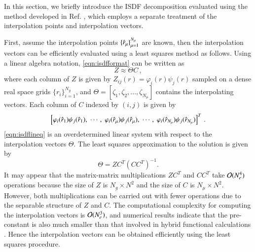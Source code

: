 In this section, we briefly introduce the ISDF decomposition 
\cite{JCP_302_329_2015_ISDF} evaluated using the method developed in Ref. 
\cite{JCTC_2017_ISDF}, which employs a separate treatment of the interpolation
points and interpolation vectors.

First, assume the interpolation points $\{\hat{r}_\mu\}_{\mu=1}^{N_{\mu}}$ are
known, then the interpolation vectors can be efficiently evaluated using a least
squares method as follows. Using a linear algebra notation, 
\cref{eqn:isdfformat} can be written as
\begin{equation}\label{eqn:isdflineq}
  Z \approx \Theta C\,,
\end{equation}
where each column of $Z$ is given by $Z_{ij}(r)=\varphi_{i}(r)\psi_{j}(r)$
sampled on a dense real space grids $\{r_{i}\}_{i=1}^{N_g}$, and $\Theta = 
[\zeta_1, \zeta_2, ..., \zeta_{N_{\mu}}]$ contains the interpolating vectors.
Each column of $C$ indexed by $(i,j)$ is given by
\begin{equation}
	\left[ \varphi_{i}(\hat{r}_1)\psi_{j}(\hat{r}_1),\; \cdots,\;
  \varphi_{i}(\hat{r}_\mu)\psi_{j}(\hat{r}_\mu),\; \cdots,\;
  \varphi_{i}(\hat{r}_{N_{\mu}})\psi_{j}(\hat{r}_{N_{\mu}})\right]^T\,.
\end{equation}
\cref{eqn:isdflineq} is an overdetermined linear system with respect to the
interpolation vectors $\Theta$. The least squares approximation to the solution
is given by
\begin{equation}\label{eq:Theta}
  \Theta = ZC^T (CC^T)^{-1}.
\end{equation}
It may appear that the matrix\hyp{}matrix multiplications $ZC^T$ and
$CC^T$ take $\mathcal{O}(N_{e}^{4})$ operations because the size of $Z$ is $N_g
\times N^2$ and the size of $C$ is $N_{\mu} \times N^2$.  However, both
multiplications can be carried out with fewer operations due to the separable
structure of $Z$ and $C$. The computational complexity for computing the
interpolation vectors is $\mathcal{O}(N_{e}^{3})$, and numerical results indicate that
the pre\hyp{}constant is also much smaller than that involved in hybrid
functional calculations \cite{JCTC_2017_ISDF}. Hence the interpolation vectors
can be obtained efficiently using the least squares procedure.


